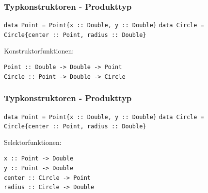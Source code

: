 \begin{frame}[fragile]
\frametitle{Typkonstruktoren - Produkttyp}
\begin{block}{\vspace*{-3ex}}
\lstinline|data Point = Point{x :: Double, y :: Double}|
\lstinline|data Circle = Circle{center :: Point, radius :: Double}|
\end{block} 
Konstruktorfunktionen: 
\pause
\begin{lstlisting}
Point :: Double -> Double -> Point
Circle :: Point -> Double -> Circle
\end{lstlisting}
\end{frame}

\begin{frame}[fragile]
\frametitle{Typkonstruktoren - Produkttyp} 
\begin{block}{\vspace*{-3ex}}
\lstinline|data Point = Point{x :: Double, y :: Double}|
\lstinline|data Circle = Circle{center :: Point, radius :: Double}|
\end{block} 
Selektorfunktionen: 
\pause
\begin{lstlisting}
x :: Point -> Double
y :: Point -> Double
center :: Circle -> Point
radius :: Circle -> Double
\end{lstlisting}
\end{frame}


